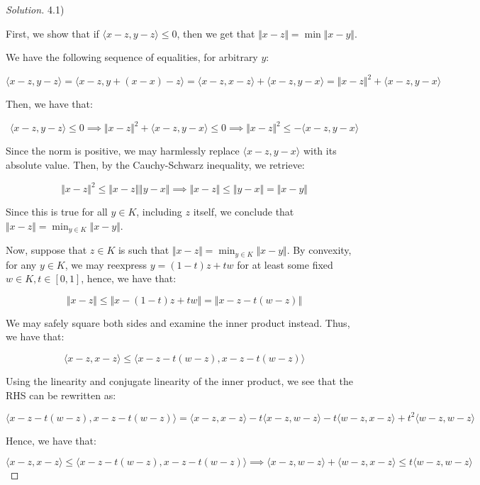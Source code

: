 \documentclass[10pt]{article}
\begin{document}
\begin{proof}[Solution]

4.1)

First, we show that if $\langle x - z, y - z \rangle \leq 0$, then we get that $\Vert x - z \Vert = \min \Vert x - y \Vert$.

We have the following sequence of equalities, for arbitrary $y$:

$$ \langle x - z, y - z \rangle = \langle x - z, y + (x - x) - z \rangle = \langle x - z, x - z \rangle + \langle x - z, y - x \rangle = \Vert x - z \Vert^2 + \langle x - z, y - x\rangle$$

Then, we have that:

$$ \langle x - z, y - z \rangle \leq 0 \implies \Vert x - z \Vert^2 + \langle x - z, y - x\rangle \leq 0 \implies \Vert x - z \Vert^2 \leq -\langle x - z, y - x\rangle $$

Since the norm is positive, we may harmlessly replace $\langle x - z, y - x \rangle $ with its absolute value. Then, by the Cauchy-Schwarz inequality, we retrieve:

$$ \Vert x - z \Vert^2 \leq \Vert x - z \Vert \Vert y - x \Vert  \implies \Vert x - z \Vert \leq \Vert y - x \Vert = \Vert x - y \Vert$$

Since this is true for all $y \in K$, including $z$ itself, we conclude that $\Vert x - z \Vert = \min_{y \in K } \Vert x - y \Vert$.

Now, suppose that $z \in K$ is such that $\Vert x - z \Vert = \min_{y \in K} \Vert x - y \Vert$. By convexity, for any $y \in K$, we may reexpress $y = (1-t)z + tw$ for at least some fixed $w \in K, t \in [0,1]$, hence, we have that:

$$ \Vert x - z \Vert \leq \Vert x - (1-t)z + tw \Vert = \Vert x - z - t(w - z) \Vert $$

We may safely square both sides and examine the inner product instead. Thus, we have that:

$$ \langle x - z, x - z \rangle \leq \langle x - z - t(w - z), x - z - t(w - z) \rangle $$

Using the linearity and conjugate linearity of the inner product, we see that the RHS can be rewritten as:

$$   \langle x - z - t(w - z), x - z - t(w - z) \rangle = \langle x - z, x - z \rangle -  t\langle x - z, w - z \rangle - t \langle  w - z, x - z \rangle + t^2 \langle w - z, w - z \rangle$$

Hence, we have that:

$$  \langle x - z, x - z \rangle \leq \langle x - z - t(w - z), x - z - t(w - z) \rangle  \implies \langle x - z, w - z \rangle + \langle w - z, x - z \rangle \leq t \langle w - z , w - z \rangle $$


\end{proof}
\end{document}
